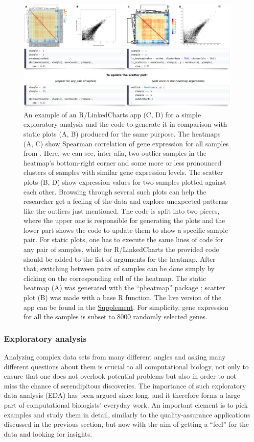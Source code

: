 \documentclass[twocolumn,10pt]{article}
\newcommand{\Supplement}{\href{https://anders-biostat.github.io/lc-paper/}{Supplement}}
\begin{document}
\begin{figure}[b]
	\includegraphics[width=\textwidth]{FigE/figE.png}
	\caption{An example of an R/LinkedCharts app (C, D) for a simple exploratory analysis and the code to generate it in comparison with static plots (A, B) produced for the same purpose.  The heatmaps (A, C) show Spearman correlation of gene expression for all samples from \citet{conway_2015}. Here, we can see, inter alia, two outlier samples in the heatmap's bottom-right corner and some more or less pronounced clusters of samples with similar gene expression levels. The scatter plots (B, D) show expression values for two samples plotted against each other. Browsing through several such plots can help the researcher get a feeling of the data and explore unexpected patterns like the outliers just mentioned. The code is split into two pieces, where the upper one is responsible for generating the plots and the lower part shows the code to update them to show a specific sample pair. For static plots, one has to execute the same lines of code for any pair of samples, while for R/LinkedCharts the provided code should be added to the list of arguments for the heatmap. After that, switching between pairs of samples can be done simply by clicking on the corresponding cell of the heatmap. The static heatmap (A) was generated with the ``pheatmap'' package  \citep{kolde_2019}; scatter plot (B) was made with a base R function. The live version of the app can be found in the \Supplement. For simplicity, gene expression for all the samples is subset to 8000 randomly selected genes.}
	\label{FigE}
\end{figure}

\subsubsection{Exploratory analysis}

Analyzing complex data sets from many different angles and asking many different questions about them is crucial to all computational biology, not only to ensure that one does not overlook potential problems but also in order to not miss the chance of serendipitous discoveries. The importance of such exploratory data analysis (EDA) has been argued since long, and it therefore forms a large part of computational biologists' everyday work. An important element is to pick examples and study them in detail, similarly to the quality-assurance applications discussed in the previous section, but now with the aim of getting a ``feel'' for the data and looking for insights.
\end{document}
